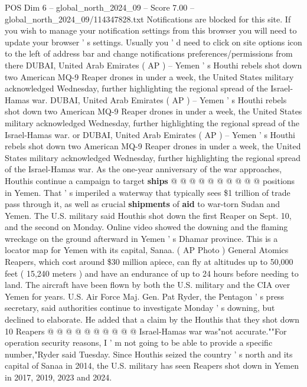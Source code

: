 \begin{textsample}{POS Dim 6 – global\_north\_2024\_09 – Score 7.00 – global\_north\_2024\_09/114347828.txt}  \label{ex:f6_pos_422}
Notifications are blocked for this site.
If you wish to manage your notification settings from this browser you will need to update your browser ' s settings.
Usually you ' d need to click on site options icon to the left of address bar and change notifications preferences/permissions from there DUBAI, United Arab Emirates ( AP ) -- Yemen ' s Houthi rebels shot down two American MQ-9 Reaper drones in under a week, the United States military acknowledged Wednesday, further highlighting the regional spread of the Israel-Hamas war.
DUBAI, United Arab Emirates ( AP ) -- Yemen ' s Houthi rebels shot down two American MQ-9 Reaper drones in under a week, the United States military acknowledged Wednesday, further highlighting the regional spread of the Israel-Hamas war. or DUBAI, United Arab Emirates ( AP ) -- Yemen ' s Houthi rebels shot down two American MQ-9 Reaper drones in under a week, the United States military acknowledged Wednesday, further highlighting the regional spread of the Israel-Hamas war.
As the one-year anniversary of the war approaches, Houthis continue a campaign to target \textbf{ships} @ @ @ @ @ @ @ @ @ @ positions in Yemen.
That ' s imperiled a waterway that typically sees \$1 trillion of trade pass through it, as well as crucial \textbf{shipments} of \textbf{aid} to war-torn Sudan and Yemen.
The U.S. military said Houthis shot down the first Reaper on Sept. 10, and the second on Monday.
Online video showed the downing and the flaming wreckage on the ground afterward in Yemen ' s Dhamar province.
This is a locator map for Yemen with its capital, Sanaa. ( AP Photo ) General Atomics Reapers, which cost around \$30 million apiece, can fly at altitudes up to 50,000 feet ( 15,240 meters ) and have an endurance of up to 24 hours before needing to land.
The aircraft have been flown by both the U.S. military and the CIA over Yemen for years.
U.S.
Air Force Maj.
Gen.
Pat Ryder, the Pentagon ' s press secretary, said authorities continue to investigate Monday ' s downing, but declined to elaborate.
He added that a claim by the Houthis that they shot down 10 Reapers @ @ @ @ @ @ @ @ @ @ Israel-Hamas war was"not accurate.""For operation security reasons, I ' m not going to be able to provide a specific number,"Ryder said Tuesday.
Since Houthis seized the country ' s north and its capital of Sanaa in 2014, the U.S. military has seen Reapers shot down in Yemen in 2017, 2019, 2023 and 2024.

\end{textsample}
